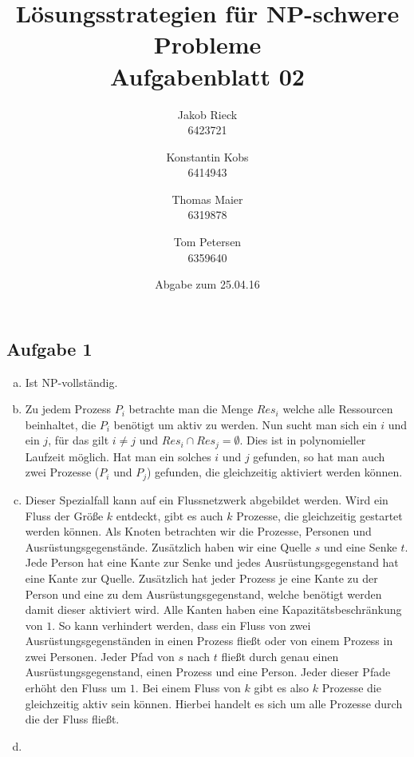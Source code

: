 \documentclass[12pt,a4paper]{article}
\title{Lösungsstrategien für NP-schwere Probleme\\Aufgabenblatt 02}
\author{
		Jakob Rieck\\
		\small{6423721}
	\and
		Konstantin Kobs\\
		\small{6414943}
	\and
		Thomas Maier\\
		\small{6319878}
	\and
		Tom Petersen\\
		\small{6359640}
}
\date{Abgabe zum 25.04.16}
\begin{document}
\maketitle

\subsection*{Aufgabe 1}

 \begin{enumerate}[a)]
 	\item Ist NP-vollständig.
 	
 	\item Zu jedem Prozess $P_i$ betrachte man die Menge $Res_i$ welche alle Ressourcen beinhaltet, die $P_i$ benötigt um aktiv zu werden. Nun sucht man sich ein $i$ und ein $j$, für das gilt $i \neq j$ und $Res_i \cap Res_j =\emptyset$. Dies ist in polynomieller Laufzeit möglich. Hat man ein solches $i$ und $j$ gefunden, so hat man auch zwei Prozesse ($P_i$ und $P_j$) gefunden, die gleichzeitig aktiviert werden können.
 	
 	\item Dieser Spezialfall kann auf ein Flussnetzwerk abgebildet werden. Wird ein Fluss der Größe $k$ entdeckt, gibt es auch $k$ Prozesse, die gleichzeitig gestartet werden können. Als Knoten betrachten wir die Prozesse, Personen und Ausrüstungsgegenstände. Zusätzlich haben wir eine Quelle $s$ und eine Senke $t$. Jede Person hat eine Kante zur Senke und jedes Ausrüstungsgegenstand hat eine Kante zur Quelle. Zusätzlich hat jeder Prozess je eine Kante zu der Person und eine zu dem Ausrüstungsgegenstand, welche benötigt werden damit dieser aktiviert wird. Alle Kanten haben eine Kapazitätsbeschränkung von $1$. So kann verhindert werden, dass ein Fluss von zwei Ausrüstungsgegenständen in einen Prozess fließt oder von einem Prozess in zwei Personen. Jeder Pfad von $s$ nach $t$ fließt durch genau einen Ausrüstungsgegenstand, einen Prozess und eine Person. Jeder dieser Pfade erhöht den Fluss um $1$. Bei einem Fluss von $k$ gibt es also $k$ Prozesse die gleichzeitig aktiv sein können. Hierbei handelt es sich um alle Prozesse durch die der Fluss fließt.  
 	\item %
\end{enumerate}
\end{document}
